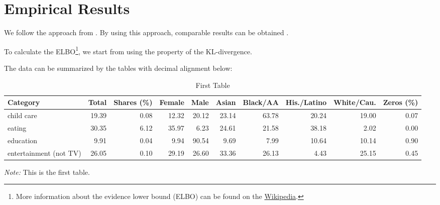 \documentclass[11pt, letterpaper]{article}
\begin{document}
\section{Empirical Results}
We follow the approach from \cite{HL2019}. \lipsum[50] By using this approach, comparable results can be obtained \citep{CES2013}.

To calculate the ELBO\footnote{More information about the evidence lower bound (ELBO) can be found on the \href{https://en.wikipedia.org/wiki/Evidence_lower_bound}{Wikipedia}. }, we start from using the property of the KL-divergence. \lipsum[20]

The data can be summarized by the tables with decimal alignment below:

\renewcommand*\arraystretch{0.95}
\renewcommand{\tabcolsep}{6pt}
\begin{table}[H]
  \renewcommand{\thetable}{B.\arabic{table}a}
  \caption{First Table}
  \label{summary_a}
  \fontsize{9}{11}\selectfont
  \hspace*{-0.5cm}
  \begin{tabular}{lrrrrrrrrr}
    \toprule
    Category                   & Total & Shares (\%) & Female & Male  & Asian & Black/AA & His./Latino & White/Cau. & Zeros (\%) \\ \hline
    child care                 & 19.39 & 0.08   & 12.32  & 20.12 & 23.14 & 63.78    & 20.24       & 19.00      & 0.07  \\
    eating                     & 30.35 & 6.12   & 35.97  & 6.23 & 24.61 & 21.58    & 38.18       & 2.02      & 0.00  \\
    education                  & 9.91  & 0.04   & 9.94   & 90.54  & 9.69  & 7.99     & 10.64        & 10.14      & 0.90  \\
    entertainment (not TV)     & 26.05 & 0.10   & 29.19  & 26.60 & 33.36 & 26.13    & 4.43       & 25.15      & 0.45  \\ \bottomrule
  \end{tabular}
  \hspace*{-1cm}
  \begin{minipage}{1.065\textwidth}
    \onehalfspacing
    \vspace*{0.05cm}
    \begin{tablenotes}
      \footnotesize
      \item\textit{Note:} This is the first table.
    \end{tablenotes}
  \end{minipage}
\end{table}
\end{document}
